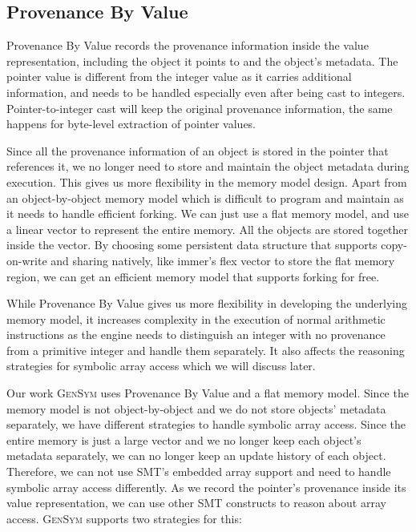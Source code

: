 \documentclass[sigplan, nonacm]{acmart}\settopmatter{printfolios=true,printccs=false,printacmref=false}
\newcommand{\tool}{\textsc{GenSym}\xspace}
\begin{document}
\subsection[short]{Provenance By Value}
Provenance By Value records the provenance information inside the value representation, including the object it points to and the object's metadata. The pointer value is different from the integer value as it carries additional information, and needs to be handled especially even after being cast to integers. Pointer-to-integer cast will keep the original provenance information, the same happens for byte-level extraction of pointer values.\par
Since all the provenance information of an object is stored in the pointer that references it, we no longer need to store and maintain the object metadata during execution. This gives us more flexibility in the memory model design. Apart from an object-by-object memory model which is difficult to program and maintain as it needs to handle efficient forking. We can just use a flat memory model, and use a linear vector to represent the entire memory. All the objects are stored together inside the vector. By choosing some persistent data structure that supports copy-on-write and sharing natively, like immer's flex vector\cite{puente2017persistence} to store the flat memory region, we can get an efficient memory model that supports forking for free.\par
While Provenance By Value gives us more flexibility in developing the underlying memory model, it increases complexity in the execution of normal arithmetic instructions as the engine needs to distinguish an integer with no provenance from a primitive integer and handle them separately. It also affects the reasoning strategies for symbolic array access which we will discuss later.\par
Our work \tool uses Provenance By Value and a flat memory model. Since the memory model is not object-by-object and we do not store objects' metadata separately, we have different strategies to handle symbolic array access. Since the entire memory is just a large vector and we no longer keep each object's metadata separately, we can no longer keep an update history of each object. Therefore, we can not use SMT's embedded array support and need to handle symbolic array access differently. As we record the pointer's provenance inside its value representation, we can use other SMT constructs to reason about array access. \tool supports two strategies for this:
\end{document}
